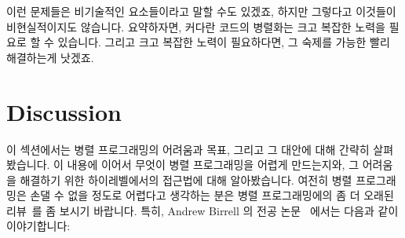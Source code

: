 {\begin{enumerate}

	\end{enumerate}

	이런 문제들은 비기술적인 요소들이라고 말할 수도 있겠죠, 하지만 그렇다고
	이것들이 비현실적이지도 않습니다.
	요약하자면, 커다란 코드의 병렬화는 크고 복잡한 노력을 필요로 할 수
	있습니다.
	그리고 크고 복잡한 노력이 필요하다면, 그 숙제를 가능한 빨리 해결하는게
	낫겠죠.

} \QuickQuizEnd

\section{Discussion}
\label{sec:intro:Discussion}

이 섹션에서는 병렬 프로그래밍의 어려움과 목표, 그리고 그 대안에 대해 간략히
살펴봤습니다.
이 내용에 이어서 무엇이 병렬 프로그래밍을 어렵게 만드는지와, 그 어려움을
해결하기 위한 하이레벨에서의 접근법에 대해 알아봤습니다.
여전히 병렬 프로그래밍은 손댈 수 없을 정도로 어렵다고 생각하는 분은 병렬
프로그래밍에의 좀 더 오래된
리뷰~\cite{SQNTParallel,AndrewDBirrell1989Threads,Beck85,Inman85}를 좀 보시기
바랍니다.
특히, Andrew Birrell 의 전공 논문~\cite{AndrewDBirrell1989Threads} 에서는
다음과 같이 이야기합니다:

